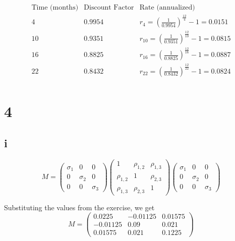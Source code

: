 \documentclass{article}
\begin{document}
\[
    \begin{array}{c|c|c}
        \text{Time (months)} & \text{Discount Factor} & \text{Rate (annualized)}                                              \\
        \hline
        4                    & 0.9954                 & r_4 = \left( \frac{1}{0.9954} \right)^{\frac{12}{4}} - 1 = 0.0151     \\
        10                   & 0.9351                 & r_{10} = \left( \frac{1}{0.9351} \right)^{\frac{12}{10}} - 1 = 0.0815 \\
        16                   & 0.8825                 & r_{16} = \left( \frac{1}{0.8825} \right)^{\frac{12}{16}} - 1 = 0.0887 \\
        22                   & 0.8432                 & r_{22} = \left( \frac{1}{0.8432} \right)^{\frac{12}{22}} - 1 = 0.0824 \\
    \end{array}
\]


\section*{4}
\subsection*{i}
\[
    M =
    \begin{pmatrix}
        \sigma_1 & 0        & 0        \\
        0        & \sigma_2 & 0        \\
        0        & 0        & \sigma_3
    \end{pmatrix}
    \begin{pmatrix}
        1          & \rho_{1,2} & \rho_{1,3} \\
        \rho_{1,2} & 1          & \rho_{2,3} \\
        \rho_{1,3} & \rho_{2,3} & 1
    \end{pmatrix}
    \begin{pmatrix}
        \sigma_1 & 0        & 0        \\
        0        & \sigma_2 & 0        \\
        0        & 0        & \sigma_3
    \end{pmatrix}
\]

Substituting the values from the exercise, we get
\[
    M =
    \begin{pmatrix}
        0.0225   & -0.01125 & 0.01575 \\
        -0.01125 & 0.09     & 0.021   \\
        0.01575  & 0.021    & 0.1225
    \end{pmatrix}
\]
\end{document}
